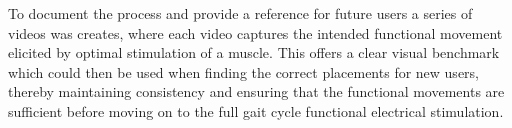To document the process and provide a reference for future users a series of videos was creates, where each video captures the intended functional movement elicited by optimal stimulation of a muscle. This offers a clear visual benchmark which could then be used when finding the correct placements for new users, thereby maintaining consistency and ensuring that the functional movements are sufficient before moving on to the full gait cycle functional electrical stimulation.




















